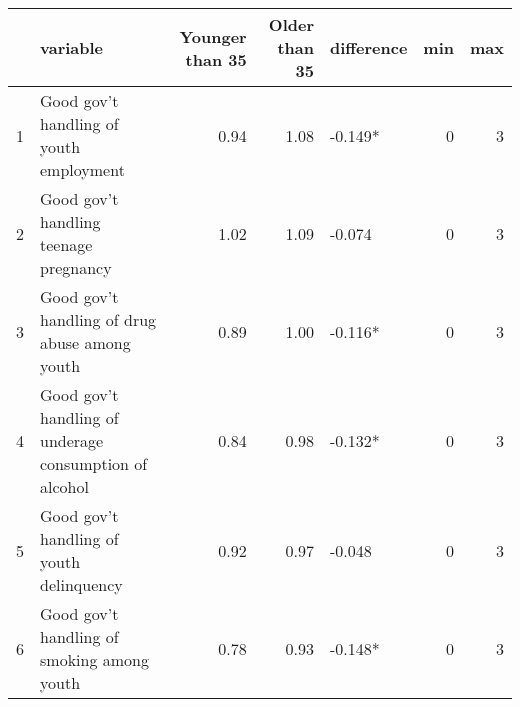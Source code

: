 \begingroup\fontsize{15}{17}\selectfont

\begin{tabular}{l|l|r|r|l|r|r}
\hline
  & variable & Younger than 35 & Older than 35 & difference & min & max\\
\hline
1 & Good gov't handling of youth employment & 0.94 & 1.08 & -0.149* & 0 & 3\\
\hline
2 & Good gov't handling teenage pregnancy & 1.02 & 1.09 & -0.074 & 0 & 3\\
\hline
3 & Good gov't handling of drug abuse among youth & 0.89 & 1.00 & -0.116* & 0 & 3\\
\hline
4 & Good gov't handling of underage consumption of alcohol & 0.84 & 0.98 & -0.132* & 0 & 3\\
\hline
5 & Good gov't handling of youth delinquency & 0.92 & 0.97 & -0.048 & 0 & 3\\
\hline
6 & Good gov't handling of smoking among youth & 0.78 & 0.93 & -0.148* & 0 & 3\\
\hline
\end{tabular}
\endgroup{}
